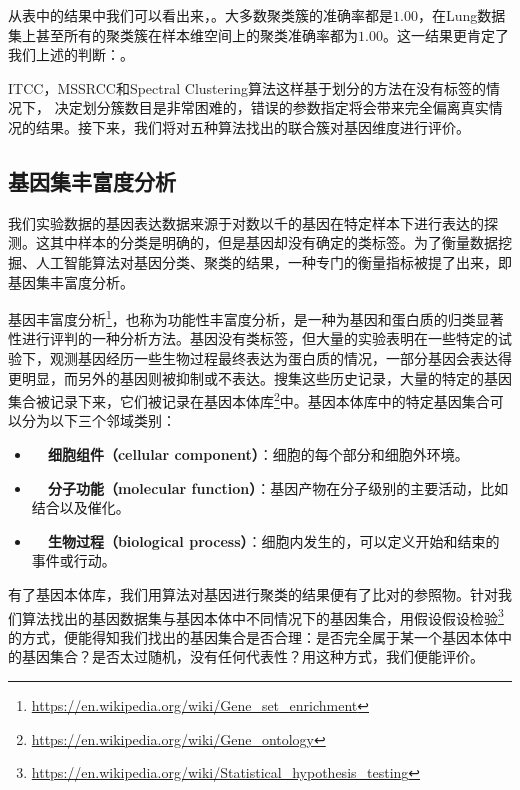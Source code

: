 从表中的结果中我们可以看出来，。大多数聚类簇的准确率都是$1.00$，在Lung数据集上甚至所有的聚类簇在样本维空间上的聚类准确率都为$1.00$。这一结果更肯定了我们上述的判断：。

ITCC，MSSRCC和Spectral Clustering算法这样基于划分的方法在没有标签的情况下， 决定划分簇数目是非常困难的，错误的参数指定将会带来完全偏离真实情况的结果。接下来，我们将对五种算法找出的联合簇对基因维度进行评价。

\subsection{基因集丰富度分析}
\label{subsec:analysis}
我们实验数据的基因表达数据来源于对数以千的基因在特定样本下进行表达的探测。这其中样本的分类是明确的，但是基因却没有确定的类标签。为了衡量数据挖掘、人工智能算法对基因分类、聚类的结果，一种专门的衡量指标被提了出来，即基因集丰富度分析。

基因丰富度分析\footnote{\url{https://en.wikipedia.org/wiki/Gene_set_enrichment}}，也称为功能性丰富度分析，是一种为基因和蛋白质的归类显著性进行评判的一种分析方法。基因没有类标签，但大量的实验表明在一些特定的试验下，观测基因经历一些生物过程最终表达为蛋白质的情况，一部分基因会表达得更明显，而另外的基因则被抑制或不表达。搜集这些历史记录，大量的特定的基因集合被记录下来，它们被记录在基因本体库\footnote{\url{https://en.wikipedia.org/wiki/Gene_ontology}}中。基因本体库中的特定基因集合可以分为以下三个邻域类别：
\begin{itemize}
\item \textbf{~~细胞组件（cellular component）}：细胞的每个部分和细胞外环境。
\item \textbf{~~分子功能（molecular function）}：基因产物在分子级别的主要活动，比如结合以及催化。
\item \textbf{~~生物过程（biological process）}：细胞内发生的，可以定义开始和结束的事件或行动。
\end{itemize}

有了基因本体库，我们用算法对基因进行聚类的结果便有了比对的参照物。针对我们算法找出的基因数据集与基因本体中不同情况下的基因集合，用假设假设检验\footnote{\url{https://en.wikipedia.org/wiki/Statistical_hypothesis_testing}}的方式，便能得知我们找出的基因集合是否合理：是否完全属于某一个基因本体中的基因集合？是否太过随机，没有任何代表性？用这种方式，我们便能评价。

